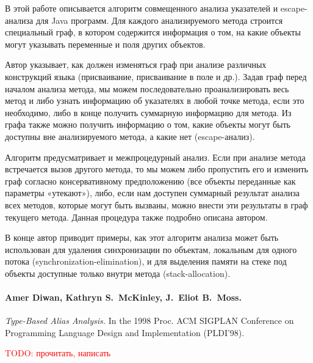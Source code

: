 \documentclass[12pt]{article}
\newcommand{\eng}[1]{{\English#1}}
\newcommand{\todo}[1]{\textcolor{red}{TODO: #1}}
\begin{document}
      В этой работе описывается алгоритм совмещенного анализа указателей и
      escape-анализа для Java программ. Для каждого анализируемого
      метода строится специальный граф, в котором содержится информация о том,
      на какие объекты могут указывать переменные и поля других объектов.

      Автор указывает, как должен изменяться граф при анализе различных
      конструкций языка (присваивание, присваивание в поле и др.).
      Задав граф перед началом анализа метода, мы можем последовательно
      проанализировать весь метод и либо узнать информацию об указателях в
      любой точке метода, если это необходимо, либо в конце получить суммарную
      информацию для метода. Из графа также можно получить информацию о том,
      какие объекты могут быть доступны вне анализируемого метода, а какие нет
      (escape-анализ).

      Алгоритм предусматривает и межпроцедурный анализ. Если при анализе
      метода встречается вызов другого метода, то мы можем либо пропустить его
      и изменить граф согласно консервативному предположению (все объекты
      переданные как параметры «утекают»), либо, если нам доступен суммарный
      результат анализа всех методов, которые могут быть вызваны, можно внести
      эти результаты в граф текущего метода. Данная процедура также подробно
      описана автором.

      В конце автор приводит примеры, как этот алгоритм анализа может быть
      использован для удаления синхронизации по объектам, локальным для одного
      потока (\eng{synchronization-elimination}), и
      для выделения памяти на стеке под объекты доступные только внутри метода
      (\eng{stack-allocation}).

    \paragraph{Amer Diwan, Kathryn S.~McKinley, J.~Eliot B.~Moss.}
      \eng{
        \textit{Type-Based Alias Analysis.}
        In the 1998 Proc. ACM SIGPLAN Conference on Programming Language
        Design and Implementation (PLDI’98).
      }

      \todo{прочитать, написать}
\end{document}
